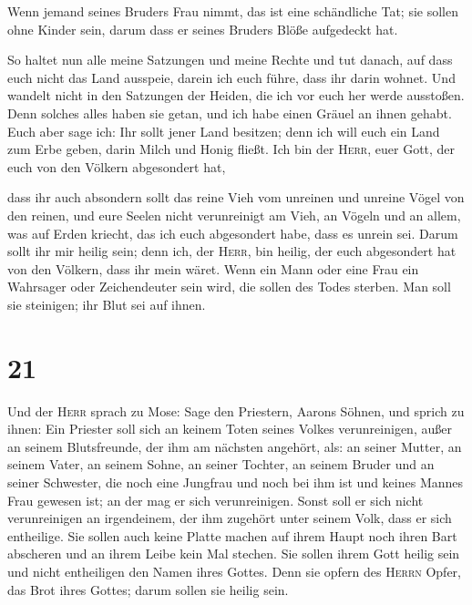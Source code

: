  Wenn jemand seines Bruders Frau nimmt, das ist eine
schändliche Tat; sie sollen ohne Kinder sein, darum dass er seines
Bruders Blöße aufgedeckt hat.

 So haltet nun alle meine Satzungen und meine Rechte und
tut danach, auf dass euch nicht das Land ausspeie, darein ich euch
führe, dass ihr darin wohnet.  Und wandelt nicht in den
Satzungen der Heiden, die ich vor euch her werde ausstoßen. Denn solches
alles haben sie getan, und ich habe einen Gräuel an ihnen gehabt.
 Euch aber sage ich: Ihr sollt jener Land besitzen; denn
ich will euch ein Land zum Erbe geben, darin Milch und Honig fließt. Ich
bin der \textsc{Herr}, euer Gott, der euch von den Völkern abgesondert
hat,

 dass ihr auch absondern sollt das reine Vieh vom
unreinen und unreine Vögel von den reinen, und eure Seelen nicht
verunreinigt am Vieh, an Vögeln und an allem, was auf Erden kriecht, das
ich euch abgesondert habe, dass es unrein sei.  Darum
sollt ihr mir heilig sein; denn ich, der \textsc{Herr}, bin heilig, der
euch abgesondert hat von den Völkern, dass ihr mein wäret.
 Wenn ein Mann oder eine Frau ein Wahrsager oder
Zeichendeuter sein wird, die sollen des Todes sterben. Man soll sie
steinigen; ihr Blut sei auf ihnen.

\hypertarget{section-20}{%
\section{21}\label{section-20}}

 Und der \textsc{Herr} sprach zu Mose: Sage den Priestern,
Aarons Söhnen, und sprich zu ihnen: Ein Priester soll sich an keinem
Toten seines Volkes verunreinigen,  außer an seinem
Blutsfreunde, der ihm am nächsten angehört, als: an seiner Mutter, an
seinem Vater, an seinem Sohne, an seiner Tochter, an seinem Bruder
 und an seiner Schwester, die noch eine Jungfrau und noch
bei ihm ist und keines Mannes Frau gewesen ist; an der mag er sich
verunreinigen.  Sonst soll er sich nicht verunreinigen an
irgendeinem, der ihm zugehört unter seinem Volk, dass er sich
entheilige.  Sie sollen auch keine Platte machen auf ihrem
Haupt noch ihren Bart abscheren und an ihrem Leibe kein Mal stechen.
 Sie sollen ihrem Gott heilig sein und nicht entheiligen
den Namen ihres Gottes. Denn sie opfern des \textsc{Herrn} Opfer, das
Brot ihres Gottes; darum sollen sie heilig sein.

